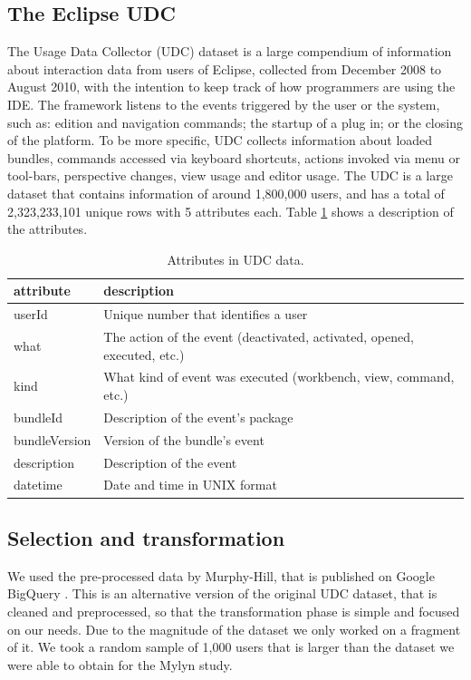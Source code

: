 \documentclass[times]{smrauth}
\begin{document}
\subsection{The Eclipse UDC}
The Usage Data Collector (UDC) dataset is a large compendium of information about interaction data from users of Eclipse, collected from December 2008 to August 2010, with the intention to keep track of how programmers are using the IDE. The framework listens to the events triggered by the user or the system, such as: edition and navigation commands; the startup of a plug in; or the closing of the platform. To be more specific, UDC collects information about loaded bundles, commands accessed via keyboard shortcuts, actions invoked via menu or tool-bars, perspective changes, view usage and editor usage. The UDC is a large dataset that contains information of around 1,800,000 users, and has a total of 2,323,233,101 unique rows with 5 attributes each. Table \ref{tbl:att_udc} shows a description of the attributes.


\begin{table}[ht!]
\tiny
\renewcommand{\arraystretch}{1.3}
\caption{Attributes in UDC data. }
\label{tbl:att_udc}
\centering
\begin{tabular}{|p{2.5cm}|p{7cm}|} 
  \hline 
attribute & description \\  
  \hline 
    \hline 
userId &  Unique number that identifies a user \\
what & The action of the event (deactivated, activated, opened, executed, etc.)  \\
kind & What kind of event was executed (workbench, view, command, etc.)  \\
bundleId & Description of the event's package  \\
bundleVersion & Version of the bundle's event  \\
description & Description of the event\\
datetime & Date and time in UNIX format\\
  \hline
\end{tabular}

\end{table}

\subsection{Selection and transformation}
We used the pre-processed data by Murphy-Hill, that is published on Google BigQuery \cite{SnipesETALASD}. This is an alternative version of the original UDC dataset, that is cleaned and preprocessed, so that the transformation phase is simple and focused on our needs. Due to the magnitude of the dataset we only worked on a fragment of it. We took a random sample of 1,000 users that is larger than the dataset we were able to obtain for the Mylyn study.
\end{document}

